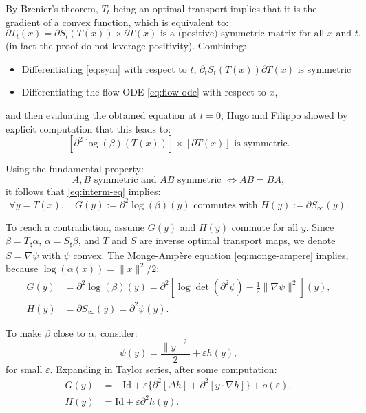 \documentclass{article}
\begin{document}
By Brenier's theorem, $T_t$ being an optimal transport implies that it is the gradient of a convex function, which is equivalent to:
\begin{equation}\label{eq:sym}
    \partial T_t(x) = \partial S_t(T(x)) \times \partial T(x) \text{ is a (positive) symmetric matrix for all } x \text{ and } t. 
\end{equation}
(in fact the proof do not leverage positivity). Combining:
\begin{itemize}
\item Differentiating \eqref{eq:sym} with respect to $t$, $\partial_t S_t(T(x)) \partial T(x)$ is symmetric
\item Differentiating the flow ODE \eqref{eq:flow-ode} with respect to $x$,
\end{itemize}
and then evaluating the obtained equation at $t = 0$, Hugo and Filippo showed by explicit computation that this leads to:
\begin{equation}\label{eq:interm-eq}
    [\partial^2 \log(\beta)(T(x))] \times [\partial T(x)] \text{ is symmetric.} 
\end{equation}

Using the fundamental property:
\[
    A, B \text{ symmetric and } AB \text{ symmetric } \iff AB = BA,
\]
it follows that \eqref{eq:interm-eq} implies:
\begin{equation}
    \forall y = T(x), \quad G(y) := \partial^2 \log(\beta)(y) \text{ commutes with } H(y) := \partial S_\infty(y).
\end{equation}

To reach a contradiction, assume $G(y)$ and $H(y)$ commute for all $y$. Since $\beta = T_\sharp \alpha$, $\alpha = S_\sharp \beta$, and $T$ and $S$ are inverse optimal transport maps, we denote $S = \nabla \psi$ with $\psi$ convex. The Monge-Ampère equation \eqref{eq:monge-ampere} implies, because $\log(\alpha(x)) = \|x\|^2/2$:
\begin{align*}
    G(y) &= \partial^2 \log(\beta)(y) = \partial^2 \left[\log\det(\partial^2 \psi) - \frac{1}{2} \|\nabla \psi\|^2\right](y), \\
    H(y) &= \partial S_\infty(y) = \partial^2 \psi(y).
\end{align*}

To make $\beta$ close to $\alpha$, consider:
\[
    \psi(y) = \frac{\|y\|^2}{2} + \varepsilon h(y),
\]
for small $\varepsilon$. Expanding in Taylor series, after some computation:
\begin{align*}
    G(y) &= -\text{Id} + \varepsilon \{\partial^2[\Delta h] + \partial^2[y \cdot \nabla h]\} + o(\varepsilon), \\
    H(y) &= \text{Id} + \varepsilon \partial^2 h(y).
\end{align*}
\end{document}
